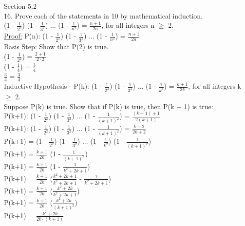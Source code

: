 \documentclass{article}
\begin{document}
Section 5.2\\
16. Prove each of the statements in 10 by mathematical induction.\\
(1 - {\Large $\frac{1}{2^2}$}) (1 - {\Large $\frac{1}{3^2}$}) ... (1 - {\Large $\frac{1}{n^2}$}) = {\Large $\frac{n + 1}{2n}$}, for all integers n $\geq$ 2.\\
\underline{Proof:} P(n): (1 - {\Large $\frac{1}{2^2}$}) (1 - {\Large $\frac{1}{3^2}$}) ... (1 - {\Large $\frac{1}{n^2}$}) = {\Large $\frac{n + 1}{2n}$} \\
Basis Step: Show that P(2) is true. \\
(1 - {\Large $\frac{1}{2^2}$}) = {\Large $\frac{2 + 1}{2 \cdot 2}$}\\
(1 - {\Large $\frac{1}{4}$}) = {\Large $\frac{3}{4}$}\\
{\Large $\frac{3}{4}$} = {\Large $\frac{3}{4}$} {\Large \checkmark}\\
Inductive Hypothesis - 
P(k): (1 - {\Large $\frac{1}{2^2}$}) (1 - {\Large $\frac{1}{3^2}$}) ... (1 - {\Large $\frac{1}{k^2}$}) = {\Large $\frac{k + 1}{2k}$}, for all integers k $\geq$ 2.\\
Suppose P(k) is true. Show that if P(k) is true, then P(k + 1) is true: \\
P(k+1): (1 - {\Large $\frac{1}{2^2}$}) (1 - {\Large $\frac{1}{3^2}$}) ... (1 - {\Large $\frac{1}{(k+1)^2}$}) = {\Large $\frac{(k + 1) + 1}{2(k + 1)}$} \\
P(k+1): (1 - {\Large $\frac{1}{2^2}$}) (1 - {\Large $\frac{1}{3^2}$}) ... (1 - {\Large $\frac{1}{(k+1)^2}$}) = {\Large $\frac{k + 2}{2k + 2}$} \\
P(k+1) = (1 - {\Large $\frac{1}{2^2}$}) (1 - {\Large $\frac{1}{3^2}$}) ... (1 - {\Large $\frac{1}{k^2}$}) (1 - {\Large $\frac{1}{(k+1)^2}$}) \\
P(k+1) = {\Large $\frac{k + 1}{2k}$}  (1 - {\Large $\frac{1}{(k+1)^2}$}) \\
P(k+1) = {\Large $\frac{k + 1}{2k}$}  (1 - {\Large $\frac{1}{k^2 + 2k + 1}$}) \\
P(k+1) = {\Large $\frac{k + 1}{2k}$}  ({\Large $\frac{k^2 + 2k + 1}{k^2 + 2k + 1}$} - {\Large $\frac{1}{k^2 + 2k + 1}$}) \\
P(k+1) = {\Large $\frac{k + 1}{2k}$}  ({\Large $\frac{k^2 + 2k}{k^2 + 2k + 1}$}) \\
P(k+1) = {\Large $\frac{k + 1}{2k}$}  ({\Large $\frac{k^2 + 2k}{(k+1)^2}$}) \\
P(k+1) = {\Large $\frac{k^2 + 2k}{2k \cdot (k+1)}$} \\
\end{document}
